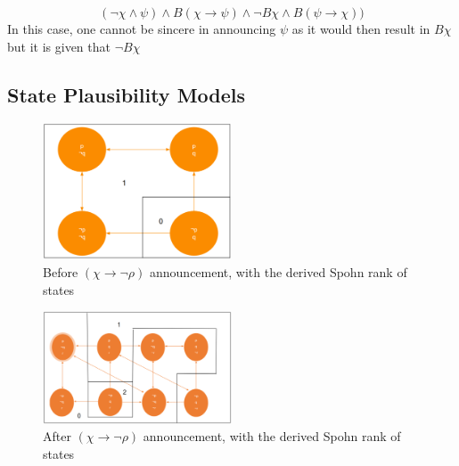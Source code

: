 \documentclass[12pt, titlepage, twoside]{report}
\begin{document}
$$(\neg \chi \wedge \psi) \wedge B(\chi \to \psi) \wedge \neg B \chi \wedge B(\psi \to \chi))$$
In this case, one cannot be sincere in announcing $\psi$ as it would then result in $B\chi$ but it is given that $\neg B \chi$

\subsection{State Plausibility Models}
\quad
\newline
\begin{figure}[h!]
  \centering
  \includegraphics[width=0.5\textwidth]{slide34.eps}
  \caption{Before $(\chi \to \neg \rho)$ announcement, with the derived Spohn rank of states}
\end{figure}
\begin{figure}[h!]
  \centering
  \includegraphics[width=0.5\textwidth]{slide36.eps}
  \caption{After $(\chi \to \neg \rho)$ announcement, with the derived Spohn rank of states}
\end{figure}
\quad
\newline
\end{document}

